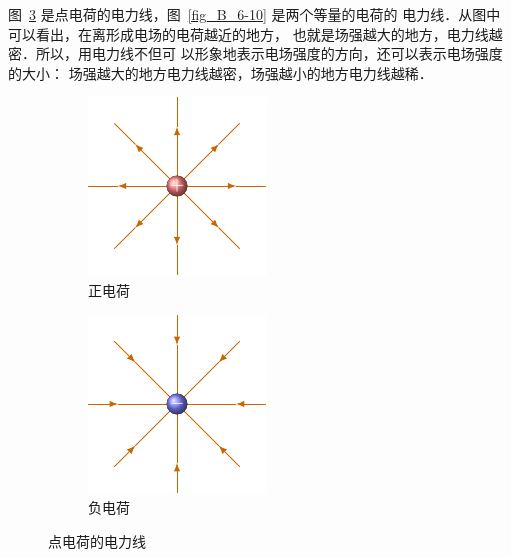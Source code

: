     
图~\ref{fig_B_6-9} 是点电荷的电力线，图~\ref{fig_B_6-10} 是两个等量的电荷的
电力线．从图中可以看出，在离形成电场的电荷越近的地方，
也就是场强越大的地方，电力线越密．所以，用电力线不但可
以形象地表示电场强度的方向，还可以表示电场强度的大小：
场强越大的地方电力线越密，场强越小的地方电力线越稀．


\begin{figure}[htbp]
	\centering
	\begin{subfigure}{0.4\linewidth}
		\centering
		\includegraphics{fig/B/6-9a.pdf}
		\caption{正电荷}\label{fig_B_6-9a}
	\end{subfigure}
	\hfil
	\begin{subfigure}{0.4\linewidth}
		\centering
		\includegraphics{fig/B/6-9b.pdf}
		\caption{负电荷}\label{fig_B_6-9b}
	\end{subfigure}
	\caption{点电荷的电力线}\label{fig_B_6-9}
\end{figure}


